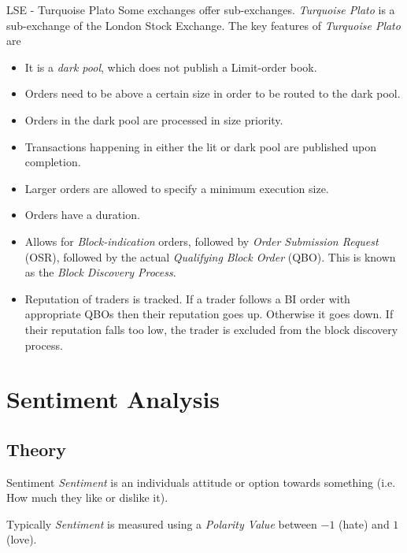 \documentclass[11pt,a4paper]{article}
\begin{document}
  \begin{definition}{LSE - Turquoise Plato}
    Some exchanges offer sub-exchanges. \textit{Turquoise Plato} is a sub-exchange of the London Stock Exchange. The key features of \textit{Turquoise Plato} are
    \begin{itemize}
      \item It is a \textit{dark pool}, which does not publish a Limit-order book.
      \item Orders need to be above a certain size in order to be routed to the dark pool.
      \item Orders in the dark pool are processed in size priority.
      \item Transactions happening in either the lit or dark pool are published upon completion.
      \item Larger orders are allowed to specify a minimum execution size.
      \item Orders have a duration.
      \item Allows for \textit{Block-indication} orders, followed by \textit{Order Submission Request} (OSR), followed by the actual \textit{Qualifying Block Order} (QBO). This is known as the \textit{Block Discovery Process}.
      \item Reputation of traders is tracked. If a trader follows a BI order with appropriate QBOs then their reputation goes up. Otherwise it goes down. If their reputation falls too low, the trader is excluded from the block discovery process.
    \end{itemize}
  \end{definition}

\section{Sentiment Analysis}

\subsection{Theory}

  \begin{definition}{Sentiment}
    \textit{Sentiment} is an individuals attitude or option towards something (i.e. How much they like or dislike it).
    \par Typically \textit{Sentiment} is measured using a \textit{Polarity Value} between $-1$ (hate) and $1$ (love).
  \end{definition}
\end{document}
